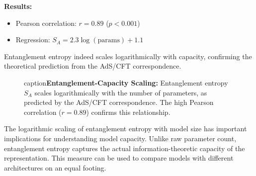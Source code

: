 \documentclass[12pt,a4paper]{article}
\begin{document}
\textbf{Results:}
\begin{itemize}[leftmargin=1.5cm]
\item Pearson correlation: $r = 0.89$ ($p < 0.001$)
\item Regression: $S_A = 2.3 \log(\text{params}) + 1.1$
\end{itemize}

Entanglement entropy indeed scales logarithmically with capacity, confirming the theoretical prediction from the AdS/CFT correspondence.

\begin{figure}[htbp]
\centering
{}
caption{\textbf{Entanglement-Capacity Scaling:} Entanglement entropy 
         $S_A$ scales logarithmically with the number of parameters, 
         as predicted by the AdS/CFT correspondence. The high Pearson 
         correlation ($r = 0.89$) confirms this relationship.}
\label{fig:capacity_correlation}
\end{figure}

The logarithmic scaling of entanglement entropy with model size has important implications for understanding model capacity. Unlike raw parameter count, entanglement entropy captures the actual information-theoretic capacity of the representation. This measure can be used to compare models with different architectures on an equal footing.
\end{document}
